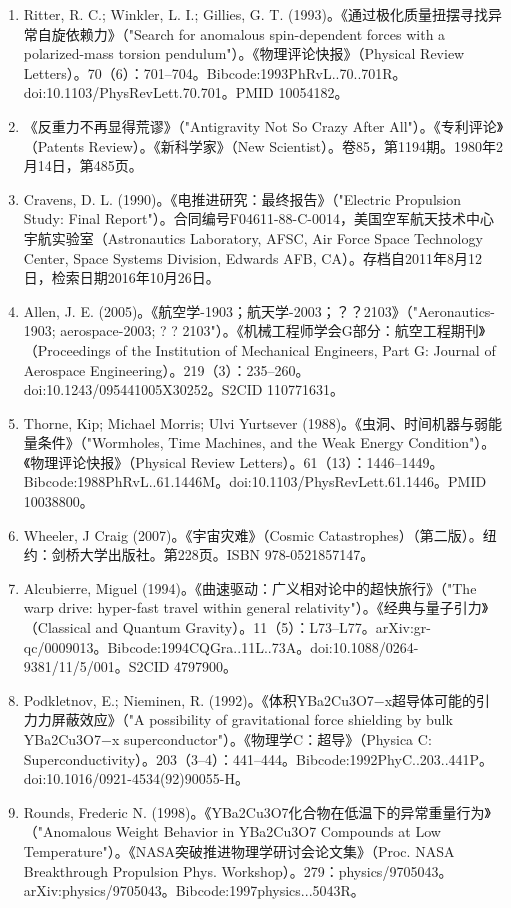\begin{enumerate}
\item Ritter, R. C.; Winkler, L. I.; Gillies, G. T. (1993)。《通过极化质量扭摆寻找异常自旋依赖力》（"Search for anomalous spin-dependent forces with a polarized-mass torsion pendulum"）。《物理评论快报》（Physical Review Letters）。70（6）：701–704。Bibcode:1993PhRvL..70..701R。doi:10.1103/PhysRevLett.70.701。PMID 10054182。
\item 《反重力不再显得荒谬》（"Antigravity Not So Crazy After All"）。《专利评论》（Patents Review）。《新科学家》（New Scientist）。卷85，第1194期。1980年2月14日，第485页。
\item Cravens, D. L. (1990)。《电推进研究：最终报告》（"Electric Propulsion Study: Final Report"）。合同编号F04611-88-C-0014，美国空军航天技术中心宇航实验室（Astronautics Laboratory, AFSC, Air Force Space Technology Center, Space Systems Division, Edwards AFB, CA）。存档自2011年8月12日，检索日期2016年10月26日。
\item Allen, J. E. (2005)。《航空学-1903；航天学-2003；？？2103》（"Aeronautics-1903; aerospace-2003; ? ? 2103"）。《机械工程师学会G部分：航空工程期刊》（Proceedings of the Institution of Mechanical Engineers, Part G: Journal of Aerospace Engineering）。219（3）：235–260。doi:10.1243/095441005X30252。S2CID 110771631。
\item Thorne, Kip; Michael Morris; Ulvi Yurtsever (1988)。《虫洞、时间机器与弱能量条件》（"Wormholes, Time Machines, and the Weak Energy Condition"）。《物理评论快报》（Physical Review Letters）。61（13）：1446–1449。Bibcode:1988PhRvL..61.1446M。doi:10.1103/PhysRevLett.61.1446。PMID 10038800。
\item Wheeler, J Craig (2007)。《宇宙灾难》（Cosmic Catastrophes）（第二版）。纽约：剑桥大学出版社。第228页。ISBN 978-0521857147。
\item Alcubierre, Miguel (1994)。《曲速驱动：广义相对论中的超快旅行》（"The warp drive: hyper-fast travel within general relativity"）。《经典与量子引力》（Classical and Quantum Gravity）。11（5）：L73–L77。arXiv:gr-qc/0009013。Bibcode:1994CQGra..11L..73A。doi:10.1088/0264-9381/11/5/001。S2CID 4797900。
\item Podkletnov, E.; Nieminen, R. (1992)。《体积YBa2Cu3O7−x超导体可能的引力力屏蔽效应》（"A possibility of gravitational force shielding by bulk YBa2Cu3O7−x superconductor"）。《物理学C：超导》（Physica C: Superconductivity）。203（3–4）：441–444。Bibcode:1992PhyC..203..441P。doi:10.1016/0921-4534(92)90055-H。
\item Rounds, Frederic N. (1998)。《YBa2Cu3O7化合物在低温下的异常重量行为》（"Anomalous Weight Behavior in YBa2Cu3O7 Compounds at Low Temperature"）。《NASA突破推进物理学研讨会论文集》（Proc. NASA Breakthrough Propulsion Phys. Workshop）。279：physics/9705043。arXiv:physics/9705043。Bibcode:1997physics...5043R。

\end{enumerate}
